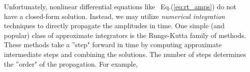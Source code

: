 Unfortunately, nonlinear differential equations like ~Eq.(\ref{eq:rt_amps}) do not have a closed-form 
solution. Instead, we may utilize \textit{numerical integration} techniques to directly propagate 
the amplitudes in time. One simple (and popular) class of approximate integrators is the Runge-Kutta 
family of methods. 
These methods take a ''step" forward in time by computing approximate intermediate steps
and combining the solutions. The number of steps determines the ''order" of the propagation. For example,

